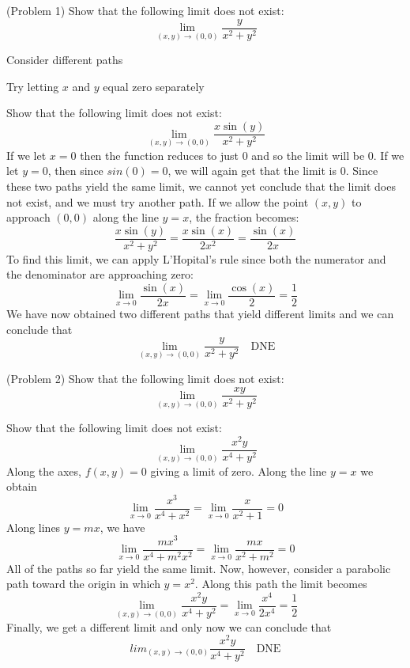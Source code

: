 \documentclass[handout]{ximera}
\begin{document}
\begin{problem}(Problem 1)
Show that the following limit does not exist:
\[
\lim_{(x,y) \to (0,0)} \frac{y}{x^2 + y^2}
\]
\begin{hint}
Consider different paths
\end{hint}
\begin{hint}
Try letting $x$ and $y$ equal zero separately
\end{hint}
\end{problem}

\begin{example}[Example 2]
Show that the following limit does not exist:
\[
\lim_{(x,y) \to (0,0)} \frac{x\sin(y)}{x^2 + y^2}
\]
If we let $x = 0$ then the function reduces to just $0$ and so the limit will be $0$. If we let $y = 0$, then since $sin (0) = 0$, we will again get that the limit is $0$.
Since these two paths yield the same limit, we cannot yet conclude that the limit does not exist, and we must try another path.
If we allow the point $(x,y)$ to approach $(0,0)$ along the line $y = x$, the fraction becomes:
\[
\frac{x\sin(y)}{x^2 + y^2} = \frac{x\sin(x)}{2x^2} = \frac{\sin(x)}{2x}
\]
To find this limit, we can apply L'Hopital's rule since both the numerator and the denominator are approaching zero:
\[
\lim_{x \to 0} \frac{\sin(x)}{2x} = \lim_{x \to 0} \frac{\cos(x)}{2} = \frac12
\]
We have now obtained two different paths that yield different limits and we can conclude that
\[
\lim_{(x,y) \to (0,0)} \frac{y}{x^2 + y^2} \quad \text{DNE}
\]
\end{example}

\begin{problem}(Problem 2)
Show that the following limit does not exist:
\[
\lim_{(x,y) \to (0,0)} \frac{xy}{x^2 + y^2}
\]
\end{problem}

\begin{example}[Example 3]
Show that the following limit does not exist:
\[
\lim_{(x,y) \to (0,0)} \frac{x^2y}{x^4 + y^2}
\]
Along the axes, $f(x,y) = 0$ giving a limit of zero. Along the line $y = x$ we obtain 
\[
\lim_{x\to 0} \frac{x^3}{x^4 + x^2} = \lim_{x\to 0} \frac{x}{x^2 + 1} = 0
\]
Along lines $ y = mx$, we have
\[
\lim_{x\to 0} \frac{mx^3}{x^4 + m^2x^2} = \lim_{x\to 0} \frac{mx}{x^2 + m^2} = 0
\]
All of the paths so far yield the same limit.  Now, however, consider a parabolic path toward the origin in which $y = x^2$.
Along this path the limit becomes
\[
\lim_{(x,y) \to (0,0)} \frac{x^2y}{x^4 + y^2} =  \lim_{x \to 0} \frac{x^4}{2x^4} = \frac12
\]
Finally, we get a different limit and only now we can conclude that
\[
lim_{(x,y) \to (0,0)} \frac{x^2y}{x^4 + y^2} \quad \text{DNE}
\]

\end{example}
\end{document}
